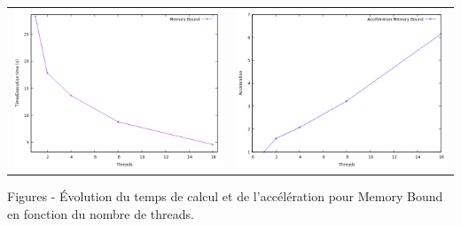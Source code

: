 	\begin{frame}
	\footnotesize\begin{longtable}{l l}		
 		\hspace{-2em} \includegraphics[scale=0.37]{Memory.png}  & \hspace{-1em}\includegraphics[scale=0.37]{Acc_Memory.png}\\
 			\end{longtable}
		 \color{blue} Figures - \color{black}Évolution du temps de calcul et de l'accélération pour Memory Bound en fonction du nombre de threads. \\
		\end{frame}
	
